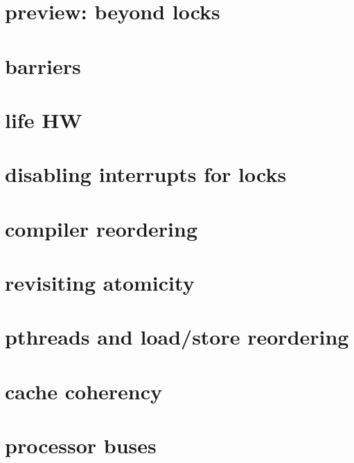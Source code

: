 \section{preview: beyond locks}


\section{barriers}


\section{life HW}


\section{disabling interrupts for locks}


%

\section{compiler reordering}


\section{revisiting atomicity}


\section{pthreads and load/store reordering}




\section{cache coherency}
\section{processor buses}


